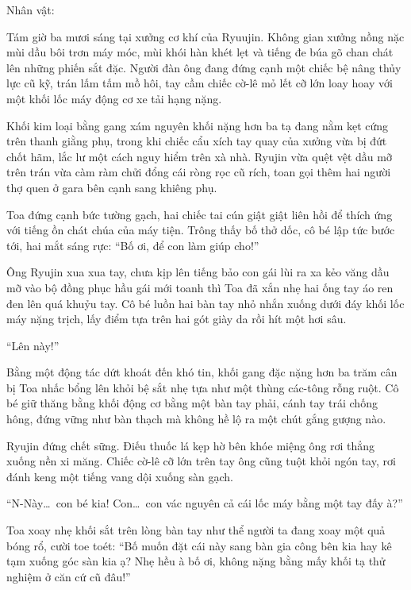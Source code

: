 \documentclass[../main.tex]{subfiles}
\begin{document}
\newpage

\begin{center}
  {\caviar\fontsize{12pt}{12pt}\selectfont Nhân vật: }
\end{center}


Tám giờ ba mươi sáng tại xưởng cơ khí của Ryuujin. Không gian xưởng nồng nặc mùi dầu bôi trơn máy móc, mùi khói hàn khét lẹt và tiếng đe búa gõ chan chát lên những phiến sắt đặc. Người đàn ông đang đứng cạnh một chiếc bệ nâng thủy lực cũ kỹ, trán lấm tấm mồ hôi, tay cầm chiếc cờ-lê mỏ lết cỡ lớn loay hoay với một khối lốc máy động cơ xe tải hạng nặng.

Khối kim loại bằng gang xám nguyên khối nặng hơn ba tạ đang nằm kẹt cứng trên thanh giằng phụ, trong khi chiếc cẩu xích tay quay của xưởng vừa bị đứt chốt hãm, lắc lư một cách nguy hiểm trên xà nhà. Ryujin vừa quệt vệt dầu mỡ trên trán vừa càm ràm chửi đổng cái ròng rọc cũ rích, toan gọi thêm hai người thợ quen ở gara bên cạnh sang khiêng phụ.

Toa đứng cạnh bức tường gạch, hai chiếc tai cún giật giật liên hồi để thích ứng với tiếng ồn chát chúa của máy tiện. Trông thấy bố thở dốc, cô bé lập tức bước tới, hai mắt sáng rực: ``Bố ơi, để con làm giúp cho!''

Ông Ryujin xua xua tay, chưa kịp lên tiếng bảo con gái lùi ra xa kẻo văng dầu mỡ vào bộ đồng phục hầu gái mới toanh thì Toa đã xắn nhẹ hai ống tay áo ren đen lên quá khuỷu tay. Cô bé luồn hai bàn tay nhỏ nhắn xuống dưới đáy khối lốc máy nặng trịch, lấy điểm tựa trên hai gót giày da rồi hít một hơi sâu.

``Lên này!''

Bằng một động tác dứt khoát đến khó tin, khối gang đặc nặng hơn ba trăm cân bị Toa nhấc bổng lên khỏi bệ sắt nhẹ tựa như một thùng các-tông rỗng ruột. Cô bé giữ thăng bằng khối động cơ bằng một bàn tay phải, cánh tay trái chống hông, đứng vững như bàn thạch mà không hề lộ ra một chút gắng gượng nào.

Ryujin đứng chết sững. Điếu thuốc lá kẹp hờ bên khóe miệng ông rơi thẳng xuống nền xi măng. Chiếc cờ-lê cỡ lớn trên tay ông cũng tuột khỏi ngón tay, rơi đánh keng một tiếng vang dội xuống sàn gạch.

``N-Này\dots\ con bé kia! Con\dots\ con vác nguyên cả cái lốc máy bằng một tay đấy à?''

Toa xoay nhẹ khối sắt trên lòng bàn tay như thể người ta đang xoay một quả bóng rổ, cười toe toét: ``Bố muốn đặt cái này sang bàn gia công bên kia hay kê tạm xuống góc sàn kia ạ? Nhẹ hều à bố ơi, không nặng bằng mấy khối tạ thử nghiệm ở căn cứ cũ đâu!''
\end{document}
